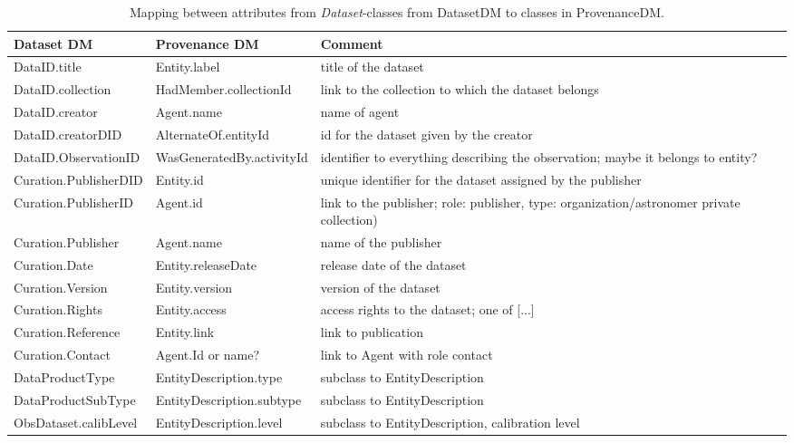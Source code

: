 \documentclass[11pt,a4paper]{ivoa}
\newcommand{\head}[1]{\textbf{#1}}
\newcommand{\class}[1]{\emph{#1}}
\begin{document}

\begin{table}[h]
\small
{}\textwidth
\begin{tabulary}{1.0\textwidth}{@{}lLp{4cm}@{}}
\toprule
\head{Dataset DM} & \head{Provenance DM} & \head{Comment}\\
\midrule
DataID.title      & Entity.label               & title of the dataset\\
DataID.collection    & HadMember.collectionId  & link to the collection to which the dataset belongs\\
DataID.creator       & Agent.name          & name of agent\\ 
DataID.creatorDID    & AlternateOf.entityId     & id for the dataset given by the creator\\
DataID.ObservationID & WasGeneratedBy.activityId  & identifier to everything describing the observation; maybe it belongs to entity?\\
Curation.PublisherDID  & Entity.id      & unique identifier for the dataset assigned by the publisher\\
Curation.PublisherID & Agent.id  & link to the publisher; role: publisher, type: organization/astronomer private collection)\\
Curation.Publisher     & Agent.name & name of the publisher\\
Curation.Date          & Entity.releaseDate & release date of the dataset\\
Curation.Version       & Entity.version     & version of the dataset\\
Curation.Rights        & Entity.access      & access rights to the dataset; one of [...]\\
Curation.Reference     & Entity.link        & link to publication\\
Curation.Contact       & Agent.Id or name? & link to Agent with role contact\\
DataProductType  & EntityDescription.type & subclass to EntityDescription\\
DataProductSubType & EntityDescription.subtype & subclass to EntityDescription\\
ObsDataset.calibLevel       & EntityDescription.level & subclass to EntityDescription, calibration level\\\hline
\bottomrule
\end{tabulary}
\caption{Mapping between attributes from \class{Dataset}-classes from DatasetDM to classes in ProvenanceDM.}
\label{tab:datasetmapping}
\end{table}
\end{document}

